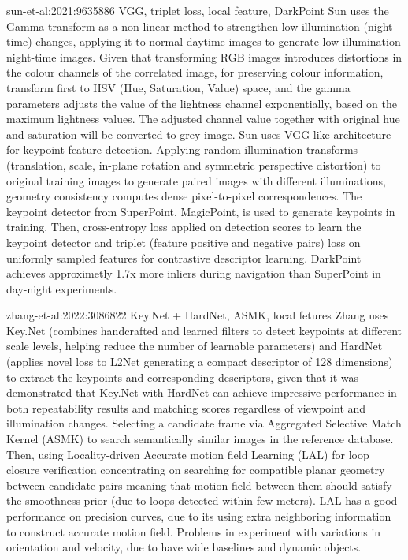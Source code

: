 
sun-et-al:2021:9635886 VGG, triplet loss, local feature, DarkPoint
Sun uses the Gamma transform as a non-linear method to strengthen low-illumination (night-time) changes, applying it to normal daytime images to generate low-illumination night-time images. Given that transforming RGB images introduces distortions in the colour channels of the correlated image, for preserving colour information, transform first to HSV (Hue, Saturation, Value) space, and the gamma parameters adjusts the value of the lightness channel exponentially, based on the maximum lightness values. The adjusted channel value together with original hue and saturation will be converted to grey image.
Sun uses VGG-like architecture for keypoint feature detection. Applying random illumination transforms (translation, scale, in-plane rotation and symmetric perspective distortion) to original training images to generate paired images with different illuminations, geometry consistency computes dense pixel-to-pixel correspondences. The keypoint detector from SuperPoint, MagicPoint, is used to generate keypoints in training. Then, cross-entropy loss applied on detection scores to learn the keypoint detector and triplet (feature positive and negative pairs) loss on uniformly sampled features for contrastive descriptor learning.
DarkPoint achieves approximetly 1.7x more inliers during navigation than SuperPoint in day-night experiments.

zhang-et-al:2022:3086822 Key.Net + HardNet, ASMK, local fetures
Zhang uses Key.Net (combines handcrafted and learned filters to detect keypoints at different scale levels, helping reduce the number of learnable parameters) and HardNet (applies novel loss to L2Net generating a compact descriptor of 128 dimensions) to extract the keypoints and corresponding descriptors, given that it was demonstrated that Key.Net with HardNet can achieve impressive performance in both repeatability results and matching scores regardless of viewpoint and illumination changes. Selecting a candidate frame via Aggregated Selective Match Kernel (ASMK) to search semantically similar images in the reference database. Then, using Locality-driven Accurate motion field Learning (LAL) for loop closure verification concentrating on searching for compatible planar geometry between candidate pairs meaning that motion field between them should satisfy the smoothness prior (due to loops detected within few meters).
LAL has a good performance on precision curves, due to its using extra neighboring information to construct
accurate motion field. Problems in experiment with variations in orientation and velocity, due to have wide baselines and dynamic objects.



